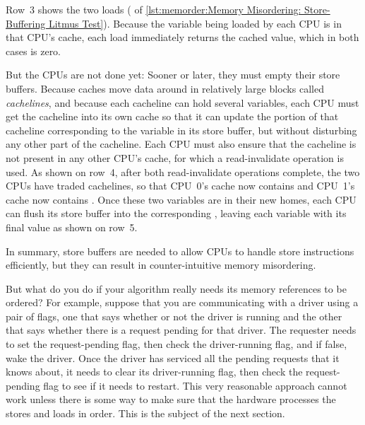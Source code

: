 \begin{fcvref}
Row~3 shows the two loads ( of
\cref{lst:memorder:Memory Misordering: Store-Buffering Litmus Test}).
Because the variable being loaded by each CPU is in that CPU's cache,
each load immediately returns the cached value, which in both cases
is zero.
\end{fcvref}

But the CPUs are not done yet:
Sooner or later, they must empty their store buffers.
Because caches move data around in relatively large blocks called
\emph{cachelines}, and because each cacheline can hold several
variables, each CPU must get the cacheline into its own cache so
that it can update the portion of that cacheline corresponding
to the variable in its store buffer, but without disturbing any
other part of the cacheline.
Each CPU must also ensure that the cacheline is not present in any other
CPU's cache, for which a read-invalidate operation is used.
As shown on row~4, after both read-invalidate operations complete,
the two CPUs have traded cachelines, so that CPU~0's cache now contains
 and CPU~1's cache now contains .
Once these two variables are in their new homes, each CPU can flush
its store buffer into the corresponding , leaving each
variable with its final value as shown on row~5.

\QuickQuizEnd

In summary, store buffers are needed to allow CPUs to handle
store instructions efficiently, but they can result in
counter-intuitive memory misordering.

But what do you do if your algorithm really needs its memory
references to be ordered?
For example, suppose that you are communicating with a driver using
a pair of flags, one that says whether or not the driver is running
and the other that says whether there is a request pending for that
driver.
The requester needs to set the request-pending flag, then check
the driver-running flag, and if false, wake the driver.
Once the driver has serviced all the pending requests that it knows about,
it needs to clear its driver-running flag, then check the request-pending
flag to see if it needs to restart.
This very reasonable approach cannot work unless there is some way
to make sure that the hardware processes the stores and loads in order.
This is the subject of the next section.

